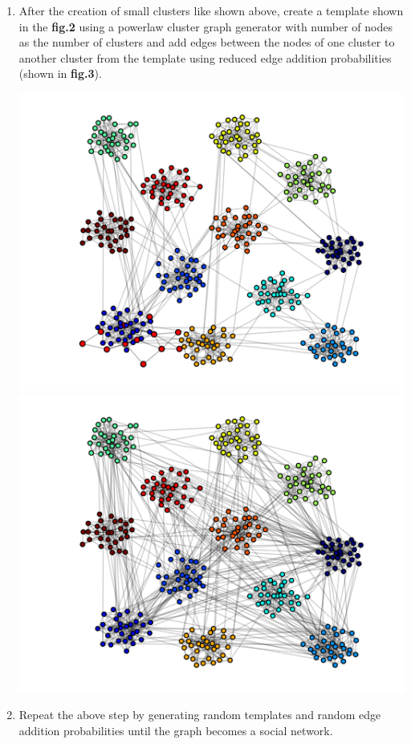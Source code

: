 \begin{enumerate}
\begin{center}
	\end{center}
	\item
	After the creation of small clusters like shown above, create a template shown in the \textbf{fig.2} using a powerlaw cluster graph generator with number of nodes as the number of clusters and add edges between the nodes of one cluster to another cluster from the template using reduced edge addition probabilities (shown in \textbf{fig.3}).
	\begin{center}
		\includegraphics[scale=0.22]{Images/datasetgen3.pdf}
		\includegraphics[scale=0.22]{Images/datasetgen4.pdf}
	\end{center}
	\item
	Repeat the above step by generating random templates and random edge addition probabilities until the graph becomes a social network.
\end{enumerate}